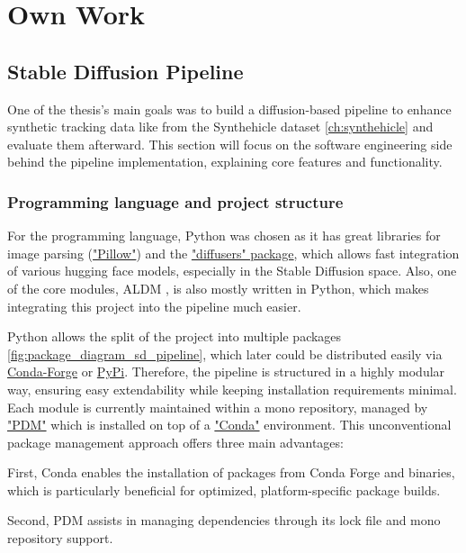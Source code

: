 \chapter{Own Work}
\label{ch:ownwork}
\section{Stable Diffusion Pipeline}

One of the thesis's main goals was to build a diffusion-based pipeline to enhance synthetic tracking data like from the Synthehicle dataset \autoref{ch:synthehicle} and evaluate them afterward. This section will focus on the software engineering side behind the pipeline implementation, explaining core features and functionality.

\subsection{Programming language and project structure}

For the programming language, Python was chosen as it has great libraries for image parsing (\href{https://github.com/python-pillow/Pillow}{"Pillow"}) and the \href{https://github.com/huggingface/diffusers}{"diffusers" package}, which allows fast integration of various hugging face models, especially in the Stable Diffusion space. Also, one of the core modules, ALDM \cite{li2024aldm}, is also mostly written in Python, which makes integrating this project into the pipeline much easier.

Python allows the split of the project into multiple packages \autoref{fig:package_diagram_sd_pipeline}, which later could be distributed easily via \href{https://conda-forge.org/}{Conda-Forge} or \href{https://pypi.org/}{PyPi}. Therefore, the pipeline is structured in a highly modular way, ensuring easy extendability while keeping installation requirements minimal. Each module is currently maintained within a mono repository, managed by \href{https://github.com/pdm-project/pdm}{"PDM"} which is installed on top of a  \href{https://docs.anaconda.com/miniconda/}{"Conda"} environment. This unconventional package management approach offers three main advantages:

First, Conda enables the installation of packages from Conda Forge and binaries, which is particularly beneficial for optimized, platform-specific package builds.

Second, PDM assists in managing dependencies through its lock file and mono repository support.

